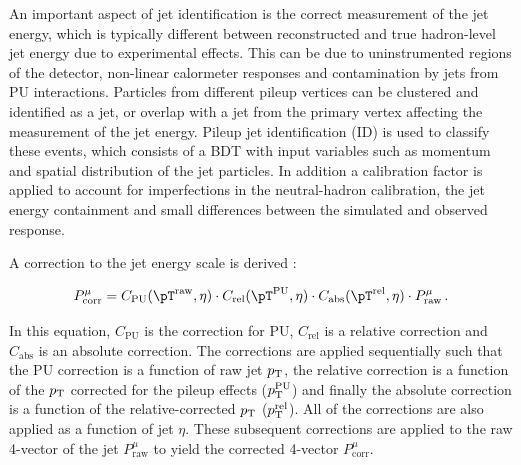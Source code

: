 An important aspect of jet identification is the correct measurement of the jet
energy, which is typically different between reconstructed and true hadron-level jet energy
due to experimental effects. This can be due to uninstrumented regions of the
detector, non-linear calormeter responses and contamination by jets from \ac{PU}
interactions. Particles from different pileup vertices can be clustered and identified as a
jet, or overlap with a jet from the primary vertex affecting the measurement of the jet energy.
Pileup jet identification (ID) is used to classify these events, which consists
of a \ac{BDT} \cite{TMVA} with input variables such as
momentum and spatial distribution of the jet particles. In addition
a calibration factor is applied to account for imperfections in the
neutral-hadron calibration, the jet energy containment and small differences
between the simulated and observed response.

A correction to the jet energy scale is derived
\cite{CMS-JME-10-011}:


\begin{equation}
P_{\text{corr}}^{\mu} = C_{\text{PU}}(\pT^{\text{raw}},\eta) \cdot
C_{\text{rel}}(\pT^{\text{PU}},\eta) \cdot C_{\text{abs}}(\pT^{\text{rel}},\eta) \cdot
P_{\text{raw}}^{\mu}\, .
\end{equation}

In this equation, $C_{\text{PU}}$ is the correction for \ac{PU},
$C_{\text{rel}}$ is a relative correction and $C_{\text{abs}}$ is an absolute
correction. The corrections are applied sequentially such that the \ac{PU}
correction is a function of raw jet $p_{\mathrm{T}}$, the relative correction is a function
of the $p_{\mathrm{T}}$ corrected for the pileup effects ($p_{\mathrm{T}}^{\text{PU}}$) and finally
the absolute correction is a function of the relative-corrected $p_{\mathrm{T}}$
($p_{\mathrm{T}}^{\text{rel}}$). All of the corrections are also applied as a function of
jet $\eta$. These subsequent corrections are applied to the raw
4-vector of the jet $P_{\text{raw}}^{\mu}$ to yield the corrected 4-vector
$P_{\text{corr}}^{\mu}$.

